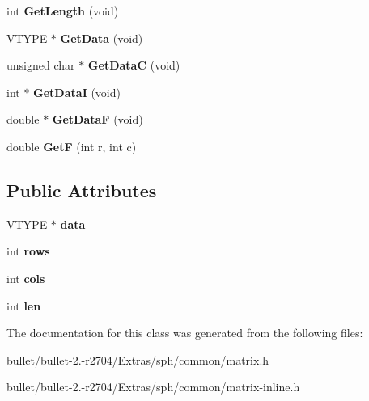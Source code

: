 \begin{DoxyCompactItemize}
\item 
\hypertarget{class_matrix_i_a23482570ada5d557941c2a2d6e9bf66a}{int {\bfseries Get\+Length} (void)}\label{class_matrix_i_a23482570ada5d557941c2a2d6e9bf66a}

\item 
\hypertarget{class_matrix_i_a255bc12d5644e16ccf314836ce3bc055}{V\+T\+Y\+P\+E $\ast$ {\bfseries Get\+Data} (void)}\label{class_matrix_i_a255bc12d5644e16ccf314836ce3bc055}

\item 
\hypertarget{class_matrix_i_ad6dc51d0dbca597c05dbfc04607c88b6}{unsigned char $\ast$ {\bfseries Get\+Data\+C} (void)}\label{class_matrix_i_ad6dc51d0dbca597c05dbfc04607c88b6}

\item 
\hypertarget{class_matrix_i_a98faa2054d17ead3c8e842be774d0714}{int $\ast$ {\bfseries Get\+Data\+I} (void)}\label{class_matrix_i_a98faa2054d17ead3c8e842be774d0714}

\item 
\hypertarget{class_matrix_i_a8a5611d73a4b78f842497b2f444817c0}{double $\ast$ {\bfseries Get\+Data\+F} (void)}\label{class_matrix_i_a8a5611d73a4b78f842497b2f444817c0}

\item 
\hypertarget{class_matrix_i_abb31e724dd75ab2e37a8002d9a0bf52e}{double {\bfseries Get\+F} (int r, int c)}\label{class_matrix_i_abb31e724dd75ab2e37a8002d9a0bf52e}

\end{DoxyCompactItemize}
\subsection*{Public Attributes}
\begin{DoxyCompactItemize}
\item 
\hypertarget{class_matrix_i_a2c2f38882b86dd091572044c159c7506}{V\+T\+Y\+P\+E $\ast$ {\bfseries data}}\label{class_matrix_i_a2c2f38882b86dd091572044c159c7506}

\item 
\hypertarget{class_matrix_i_a15f4e748b0a22ee487553cb01153aa52}{int {\bfseries rows}}\label{class_matrix_i_a15f4e748b0a22ee487553cb01153aa52}

\item 
\hypertarget{class_matrix_i_af1ee9a0468775eaa905386c94d2cfc63}{int {\bfseries cols}}\label{class_matrix_i_af1ee9a0468775eaa905386c94d2cfc63}

\item 
\hypertarget{class_matrix_i_af28bc81d0187b99dc744c7530904cb8c}{int {\bfseries len}}\label{class_matrix_i_af28bc81d0187b99dc744c7530904cb8c}

\end{DoxyCompactItemize}


The documentation for this class was generated from the following files\+:\begin{DoxyCompactItemize}
\item 
bullet/bullet-\/2.-\/r2704/\+Extras/sph/common/matrix.\+h\item 
bullet/bullet-\/2.-\/r2704/\+Extras/sph/common/matrix-\/inline.\+h\end{DoxyCompactItemize}
